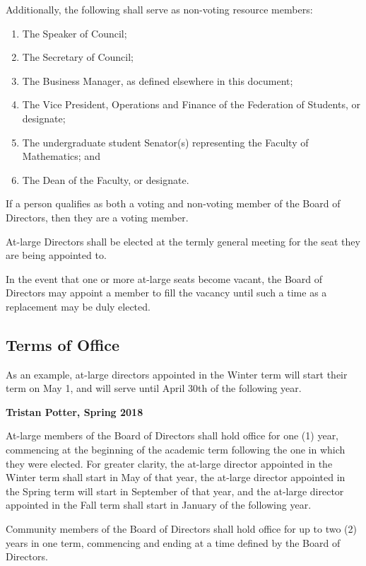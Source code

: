 \noindent Additionally, the following shall serve as non-voting resource
members:
\begin{enumerate}
  \item The Speaker of Council;
  \item The Secretary of Council;
  \item The Business Manager, as defined elsewhere in this document;
  \item The Vice President, Operations and Finance of the Federation of
      Students, or designate;
  \item The undergraduate student Senator(s) representing the Faculty of
      Mathematics; and
  \item The Dean of the Faculty, or designate.
\end{enumerate}

If a person qualifies as both a voting and non-voting member of the Board of 
Directors, then they are a voting member.

At-large Directors shall be elected at the termly general meeting for the
seat they are being appointed to.

In the event that one or more at-large seats become vacant, the Board of
Directors may appoint a member to fill the vacancy until such a time as a
replacement may be duly elected.

\subsection{Terms of Office}
\begin{annotation}
    As an example, at-large directors appointed in the Winter term will start
    their term on May 1, and will serve until April 30th of the following year.

    \textbf{Tristan Potter, Spring 2018}
\end{annotation}
At-large members of the Board of Directors shall hold office for one (1) year,
commencing at the beginning of the academic term following the one in which
they were elected. For greater clarity, the at-large director appointed in
the Winter term shall start in May of that year, the at-large director 
appointed in the Spring term will start in September of that year, and the
at-large director appointed in the Fall term shall start in January of the 
following year. 

Community members of the Board of Directors shall hold office for up to two (2)
years in one term, commencing and ending at a time defined by the Board of
Directors.

